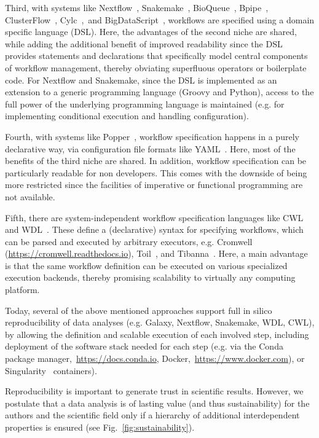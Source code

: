\documentclass[parskip=half]{scrartcl}
\let\plainurl\url
\renewcommand{\url}[1]{\protect\plainurl{#1}}
\begin{document}
Third, with systems like Nextflow~\parencite{Di_Tommaso_2017}, Snakemake~\parencite{Köster2012}, BioQueue~\parencite{Yao2017}, Bpipe~\parencite{Sadedin2012}, ClusterFlow~\parencite{Ewels2016}, Cylc~\parencite{J_Oliver_2018},~and BigDataScript~\parencite{Cingolani_2014}, workflows are specified using a domain specific language (DSL).
Here, the advantages of the second niche are shared, while adding the additional benefit of improved readability since the DSL provides statements and declarations that specifically model central components of workflow management, thereby obviating superfluous operators or boilerplate code.
For Nextflow and Snakemake, since the DSL is implemented as an extension to a generic programming language (Groovy and Python), access to the full power of the underlying programming language is maintained (e.g. for implementing conditional execution and handling configuration).

Fourth, with systems like Popper~\parencite{Jimenez_2017}, workflow specification happens in a purely declarative way, via configuration file formats like YAML~\parencite{Evans2009-vp}.
Here, most of the benefits of the third niche are shared.
In addition, workflow specification can be particularly readable for non developers.
This comes with the downside of being more restricted since the facilities of imperative or functional programming are not available.

Fifth, there are system-independent workflow specification languages like CWL~\parencite{cwl} and WDL~\parencite{voss_full-stack_2017}.
These define a (declarative) syntax for specifying workflows, which can be parsed and executed by arbitrary executors, e.g. Cromwell (\url{https://cromwell.readthedocs.io}), Toil~\parencite{Vivian_2017}, and Tibanna~\parencite{Lee_2019}.
Here, a main advantage is that the same workflow definition can be executed on various specialized execution backends, thereby promising scalability to virtually any computing platform.

Today, several of the above mentioned approaches support full in silico reproducibility of data analyses (e.g. Galaxy, Nextflow, Snakemake, WDL, CWL), by allowing the definition and scalable execution of each involved step, including deployment of the software stack needed for each step (e.g. via the Conda package manager,~\url{https://docs.conda.io}, Docker,~\url{https://www.docker.com}), or Singularity~\parencite{kurtzer_singularity_2017} containers).

Reproducibility is important to generate trust in scientific results.
However, we postulate that a data analysis is of lasting value (and thus sustainability) for the authors and the scientific field only if a hierarchy of additional interdependent properties is ensured (see Fig.~\ref{fig:sustainability}).
\end{document}
